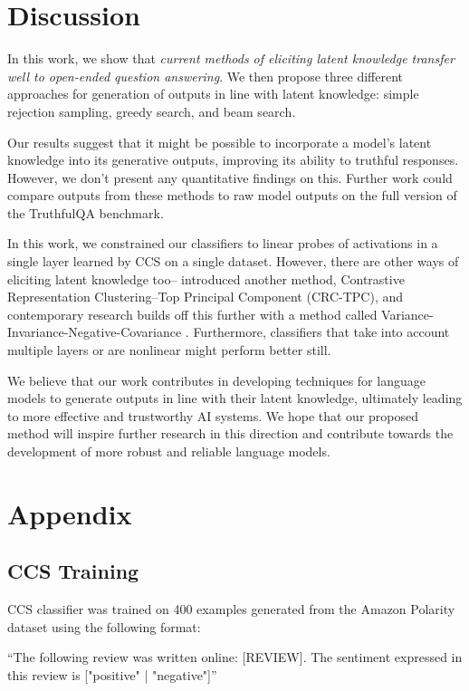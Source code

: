 \documentclass{article}
\begin{document}
\section{Discussion}

In this work, we show that {\em current methods of eliciting latent knowledge transfer well to open-ended question answering}. We then propose three different approaches for generation of outputs in line with latent knowledge: simple rejection sampling, greedy search, and beam search.

Our results suggest that it might be possible to incorporate a model's latent knowledge into its generative outputs, improving its ability to  truthful responses. However, we don't present any quantitative findings on this. Further work could compare outputs from these methods to raw model outputs on the full version of the TruthfulQA benchmark.

In this work, we constrained our classifiers to linear probes of activations in a single layer learned by CCS on a single dataset. However, there are other ways of eliciting latent knowledge too--\cite{ccs} introduced another method, Contrastive Representation Clustering–Top Principal Component (CRC-TPC), and contemporary research builds off this further with a method called Variance-Invariance-Negative-Covariance {\cite{vinc}}. Furthermore, classifiers that take into account multiple layers or are nonlinear might perform better still. 

We believe that our work contributes in developing techniques for language models to generate outputs in line with their latent knowledge, ultimately leading to more effective and trustworthy AI systems. We hope that our proposed method will inspire further research in this direction and contribute towards the development of more robust and reliable language models.

\medskip





\appendix

\section{Appendix}

\subsection{CCS Training}

CCS classifier was trained on 400 examples generated from the Amazon Polarity dataset using the following format:

``The following review was written online: [REVIEW]. The sentiment expressed in this review is ["positive" | "negative"]''




\end{document}
